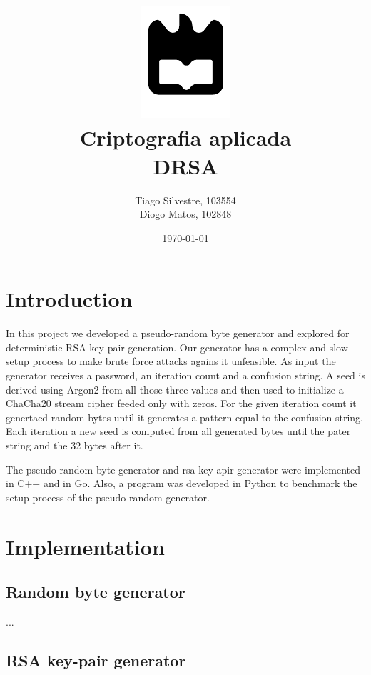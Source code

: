\documentclass{article} %
\title{%
    \includegraphics[width=0.3\linewidth]{./assets/logo.pdf}\\[20pt]
    \Huge \bfseries Criptografia aplicada \\[10pt]
    \Large DRSA
}
\author{Tiago Silvestre, 103554 \\ Diogo Matos, 102848}
\date{\today}
\begin{document}
\maketitle

\newpage

\tableofcontents

\clearpage

\section{Introduction}
In this project we developed a pseudo-random byte generator and explored for deterministic RSA key pair generation. 
Our generator has a complex and slow setup process to make brute force attacks agains it unfeasible. As input the generator receives a password, an iteration count and a confusion string.
A seed is derived using Argon2 from all those three values and then used to initialize a ChaCha20 stream cipher feeded only with zeros. For the given iteration count it genertaed random bytes until it generates 
a pattern equal to the confusion string. Each iteration a new seed is computed from all generated bytes until the pater string and the 32 bytes after it.

The pseudo random byte generator and rsa key-apir generator were implemented in C++ and in Go. Also, a program was developed in Python to benchmark the setup process of the pseudo random generator.

\section{Implementation}
\subsection{Random byte generator}
...

\subsection{RSA key-pair generator}
\end{document}
